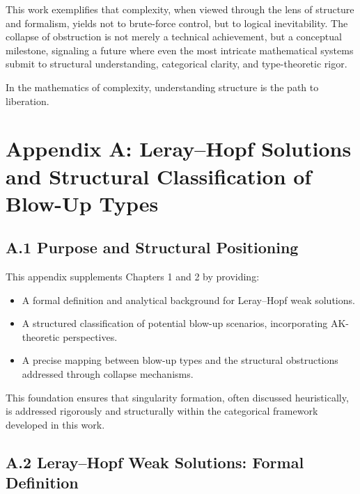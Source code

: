 \documentclass[11pt]{article}
\begin{document}
This work exemplifies that complexity, when viewed through the lens of structure and formalism, yields not to brute-force control, but to logical inevitability. The collapse of obstruction is not merely a technical achievement, but a conceptual milestone, signaling a future where even the most intricate mathematical systems submit to structural understanding, categorical clarity, and type-theoretic rigor.

In the mathematics of complexity, understanding structure is the path to liberation.


\appendix

\section*{Appendix A: Leray–Hopf Solutions and Structural Classification of Blow-Up Types}

\subsection*{A.1 Purpose and Structural Positioning}

This appendix supplements Chapters 1 and 2 by providing:

\begin{itemize}
  \item A formal definition and analytical background for Leray–Hopf weak solutions.
  \item A structured classification of potential blow-up scenarios, incorporating AK-theoretic perspectives.
  \item A precise mapping between blow-up types and the structural obstructions addressed through collapse mechanisms.
\end{itemize}

This foundation ensures that singularity formation, often discussed heuristically, is addressed rigorously and structurally within the categorical framework developed in this work.

\subsection*{A.2 Leray–Hopf Weak Solutions: Formal Definition}
\end{document}
